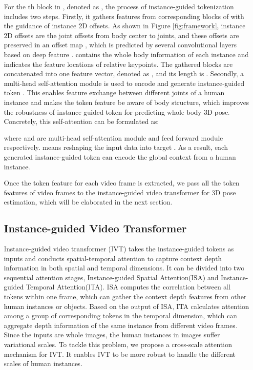 \documentclass[sigconf]{acmart}
\begin{document}
For the th block in , denoted as , the process of instance-guided tokenization includes two steps. Firstly, it gathers features from  corresponding blocks of  with the guidance of instance 2D offsets. As shown in Figure \ref{fig:framework}, instance 2D offsets are the joint offsets from body center to  joints, and these offsets are preserved in an offset map , which is predicted by several convolutional layers based on deep feature .  contains the whole body information of each instance and indicates the feature locations of relative keypoints.
The gathered blocks are concatenated into one feature vector, denoted as , and its length is . Secondly, a multi-head self-attention module is used to encode  and generate instance-guided token . This enables feature exchange between different joints of a human instance and makes the token feature be aware of body structure, which improves the robustness of instance-guided token for predicting whole body 3D pose. Concretely, this self-attention can be formulated as:

where  and  are multi-head self-attention module and feed forward module respectively.  means reshaping the input data  into target .
As a result, each generated instance-guided token  can encode the global context from a human instance.

Once the token feature  for each video frame  is extracted, we pass all the token features  of  video frames to the instance-guided video transformer for 3D pose estimation, which will be elaborated in the next section.

\subsection{Instance-guided Video Transformer}

Instance-guided video transformer (IVT) takes the instance-guided tokens  as inputs and conducts spatial-temporal attention to capture context depth information in both spatial and temporal dimensions. It can be divided into two sequential attention stages, Instance-guided Spatial Attention(ISA) and Instance-guided Temporal Attention(ITA). ISA computes the correlation between all tokens within one frame, which can gather the context depth features from other human instances or objects. Based on the output of ISA, ITA calculates attention among a group of corresponding tokens in the temporal dimension, which can aggregate depth information of the same instance from different video frames. Since the inputs are whole images, the human instances in images suffer variational scales. To tackle this problem, we propose a cross-scale attention mechanism for IVT. It enables IVT to be more robust to handle the different scales of human instances.
\end{document}
